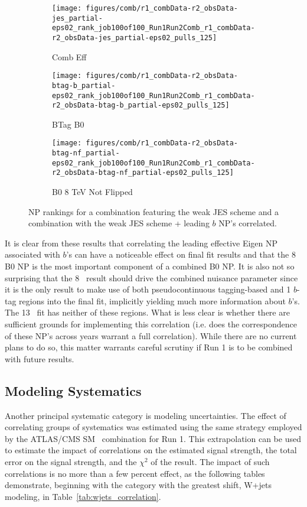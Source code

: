 \begin{figure}[!htbp]\captionsetup{justification=centering}
  \centering
\begin{subfigure}[t]{0.32\linewidth}\centering\texttt{[image: figures/comb/r1\_combData-r2\_obsData-jes\_partial-eps02\_rank\_job100of100\_Run1Run2Comb\_r1\_combData-r2\_obsData-jes\_partial-eps02\_pulls\_125]}\caption{Comb Eff}\end{subfigure}
\begin{subfigure}[t]{0.32\linewidth}\centering\texttt{[image: figures/comb/r1\_combData-r2\_obsData-btag-b\_partial-eps02\_rank\_job100of100\_Run1Run2Comb\_r1\_combData-r2\_obsData-btag-b\_partial-eps02\_pulls\_125]}\caption{BTag B0}\end{subfigure}
\begin{subfigure}[t]{0.32\linewidth}\centering\texttt{[image: figures/comb/r1\_combData-r2\_obsData-btag-nf\_partial-eps02\_rank\_job100of100\_Run1Run2Comb\_r1\_combData-r2\_obsData-btag-nf\_partial-eps02\_pulls\_125]}\caption{B0 8 TeV Not Flipped}\end{subfigure}
  \caption{NP rankings for a combination featuring the weak JES scheme and a combination with the weak JES scheme + leading $b$ NP's correlated.}
    \label{fig:Ranks:btag-b}
\end{figure}

It is clear from these results that correlating the leading effective Eigen NP associated with $b$'s can have a noticeable effect on final fit results and that the 8 \TeV B0 NP is the most important component of a combined B0 NP.  It is also not so surprising that the 8 \tev\, result should drive the combined nuisance parameter since it is the only result to make use of both pseudocontinuous tagging-based and 1 $b$-tag regions into the final fit, implicitly yielding much more information about $b$'s.  The 13 \tev\, fit has neither of these regions.  What is less clear is whether there are sufficient grounds for implementing this correlation (i.e. does the correspondence of these NP's across years warrant a full correlation).  While there are no current plans to do so, this matter warrants careful scrutiny if Run 1 is to be combined with future results.

\subsection{Modeling Systematics}
\label{sec:model}
Another principal systematic category is modeling uncertainties.  The effect of correlating groups of systematics was estimated using the same strategy employed by the ATLAS/CMS SM \vhbb\, combination for Run 1.  This extrapolation can be used to estimate the impact of correlations on the estimated signal strength, the total error on the signal strength, and the $\chi^2$ of the result.  The impact of such correlations is no more than a few percent effect, as the following tables demonstrate, beginning with the category with the greatest shift, W+jets modeling, in Table~\ref{tab:wjets_correlation}.

